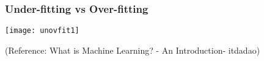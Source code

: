 
%



\begin{frame}[fragile]\frametitle{Under-fitting vs Over-fitting}
\begin{center}
\texttt{[image: unovfit1]}
\end{center}
\tiny{(Reference: What is Machine Learning? - An Introduction- itdadao)}

\end{frame}


%



